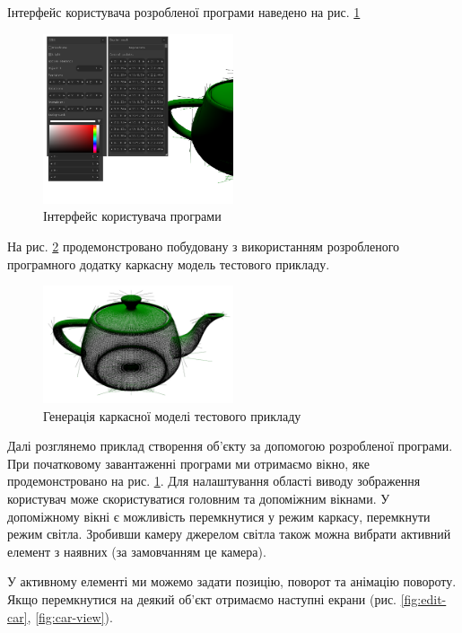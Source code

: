 \let\mypdfximage\pdfximage\def\pdfximage{\immediate\mypdfximage}\documentclass[14pt,a4paper]{extarticle}
\theoremstyle{definition}
\renewcommand{\[}{\begin{singlespace}\begin{equation*}}
\renewcommand{\]}{\end{equation*}\end{singlespace}}
\renewcommand{\+}{\discretionary{\mbox{\scriptsize$\hookleftarrow$}}{}{}}
\begin{document}
Інтерфейс користувача розробленої програми наведено на рис. \ref{fig:beginning-interface}

\begin{figure}[!htb]
    \centering
    \includegraphics[width=0.5\textwidth]{beginning-interface.png}
    \caption{Інтерфейс користувача програми}\label{fig:beginning-interface}
\end{figure}

На рис. \ref{fig:teapot-wireframe} продемонстровано побудовану з використанням розробленого програмного додатку каркасну модель тестового прикладу.

\begin{figure}[!htb]
    \centering
    \includegraphics[width=0.5\textwidth]{teapot-wireframe.png}
    \caption{Генерація каркасної моделі тестового прикладу}\label{fig:teapot-wireframe}
\end{figure}

Далі розглянемо приклад створення об'єкту за допомогою розробленої програми. При початковому завантаженні програми ми отримаємо вікно, яке продемонстровано на рис. \ref{fig:beginning-interface}. Для налаштування області виводу зображення користувач може скористуватися головним та допоміжним вікнами. У допоміжному вікні є можливість перемкнутися у режим каркасу, перемкнути режим світла. Зробивши камеру джерелом світла також можна вибрати активний елемент з наявних (за замовчанням це камера).

У активному елементі ми можемо задати позицію, поворот та анімацію повороту. Якщо перемкнутися на деякий об'єкт отримаємо наступні екрани (рис. \ref{fig:edit-car}, \ref{fig:car-view}).
\end{document}
